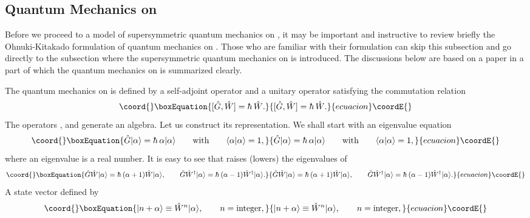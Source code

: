 \documentclass[a4paper,12pt]{article}
\begin{document}
\subsection{Quantum Mechanics on \coordHE{}}
Before we proceed to a model of supersymmetric quantum mechanics 
on \coordHE{}, it may be important and instructive to review briefly 
the Ohnuki-Kitakado formulation of quantum mechanics on \coordHE{} \cite{ok}.
Those who are familiar with their formulation can skip this subsection and 
go directly to the subsection \coordHE{} where the supersymmetric
quantum mechanics on \coordHE{} is introduced. The discussions below are 
based on a paper \cite{tanimura} in a part of which the quantum mechanics 
on \coordHE{} is summarized clearly. 
\par
The quantum mechanics on \coordHE{} is 
defined by a self-adjoint operator \myHighlight{$\hg$}\coordHE{} and a 
unitary operator \coordHE{} satisfying the commutation relation 
\begin{equation}\coord{}\boxEquation{
[\hat G, \hat W]=\hbar~{\hat W}.
\label{comm}
}{
[\hat G, \hat W]=\hbar~{\hat W}.
}{ecuacion}\coordE{}\end{equation}
The operators \myHighlight{$\hg, \hw$}\coordHE{}, and \myHighlight{$\hwd$}\coordHE{} generate an algebra.
Let us construct its representation. We shall start with 
an eigenvalue equation
\begin{equation}\coord{}\boxEquation{
{\hg} \ket{\alpha}=\hbar~\alpha \ket{\alpha}\qquad{\rm with}
\qquad \norm{\alpha}{\alpha}=1,
}{
{\hg} \ket{\alpha}=\hbar~\alpha \ket{\alpha}\qquad{\rm with}
\qquad \norm{\alpha}{\alpha}=1,
}{ecuacion}\coordE{}\end{equation}
where an eigenvalue \myHighlight{$\alpha$}\coordHE{} is a real number.
It is easy to see that \myHighlight{$\hw(\hwd)$}\coordHE{} raises (lowers) the eigenvalues of \myHighlight{$\hg$}\coordHE{}
\begin{equation}\coord{}\boxEquation{
{\hg}{\hw}\ket{\alpha}=\hbar~(\alpha+1)\hw \ket{\alpha},\qquad
{\hg}{\hwd}\ket{\alpha}=\hbar~(\alpha-1)\hwd\ket{\alpha}.
}{
{\hg}{\hw}\ket{\alpha}=\hbar~(\alpha+1)\hw \ket{\alpha},\qquad
{\hg}{\hwd}\ket{\alpha}=\hbar~(\alpha-1)\hwd\ket{\alpha}.
}{ecuacion}\coordE{}\end{equation}
A state vector defined by
\begin{equation}\coord{}\boxEquation{
\ket{n+\alpha}\equiv {\hw}^n \ket{\alpha}, \qquad n={\rm integer},
}{
\ket{n+\alpha}\equiv {\hw}^n \ket{\alpha}, \qquad n={\rm integer},
}{ecuacion}\coordE{}\end{equation}   
\end{document}
